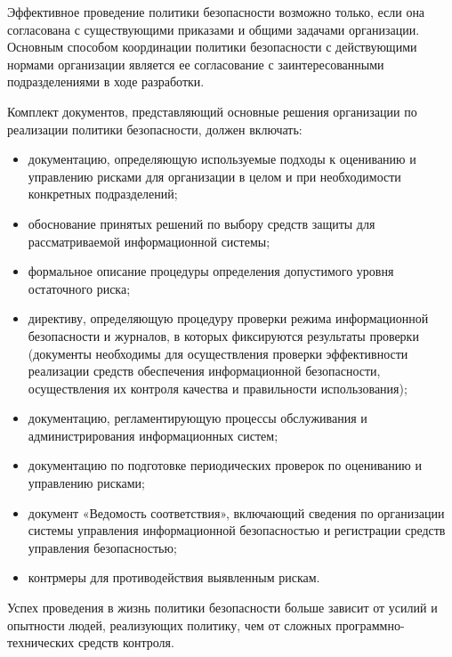 Эффективное проведение политики безопасности возможно только, если она согласована с существующими приказами
и общими задачами организации. Основным способом координации политики безопасности с действующими нормами
организации является ее согласование с заинтересованными подразделениями в ходе разработки.

Комплект документов, представляющий основные решения организации по реализации политики безопасности,
должен включать:
\begin{itemize}
    \item
        документацию, определяющую используемые подходы к оцениванию и управлению рисками для
        организации в целом и при необходимости конкретных подразделений;

    \item
        обоснование принятых решений по выбору средств защиты для рассматриваемой информационной системы;

    \item
        формальное описание процедуры определения допустимого уровня остаточного риска;

    \item
        директиву, определяющую процедуру проверки режима информационной безопасности и журналов,
        в которых фиксируются результаты проверки (документы необходимы для осуществления проверки
        эффективности реализации средств обеспечения информационной безопасности, осуществления
        их контроля качества и правильности использования);

    \item
        документацию, регламентирующую процессы обслуживания и администрирования информационных систем;

    \item
        документацию по подготовке периодических проверок по оцениванию и управлению рисками;

    \item
        документ «Ведомость соответствия», включающий сведения по организации системы управления
        информационной безопасностью и регистрации средств управления безопасностью;

    \item
        контрмеры для противодействия выявленным рискам.
\end{itemize}

Успех проведения в жизнь политики безопасности больше зависит от усилий и опытности людей, реализующих политику,
чем от сложных программно-технических средств контроля.

